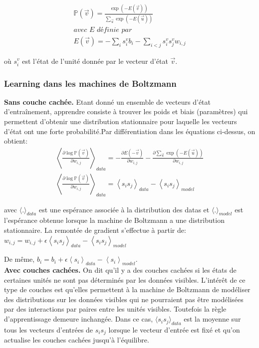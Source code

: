 \documentclass{article}
\theoremstyle{definition}
\begin{document}
\begin{align*}
\mathbb{P}(\vec{v})=\frac{\exp(-E(\vec{v}))}{\sum_{\vec{u}} \exp(-E(\vec{u}))}\\
\textit{avec E définie par}\\
E(\vec{v})=-\sum_i s_i^{v} b_i-\sum_{i < j} s_i^{v} s_j^{v} w_{i,j}
\end{align*}

\noindent où $s_i^v$ est l'état de l'unité donnée par le vecteur d'état $\vec{v}$.

\subsubsection{Learning dans les machines de Boltzmann}

\textbf{Sans couche cachée.} Etant donné un ensemble de vecteurs d'état d'entraînement, apprendre consiste à trouver les poids et biais (paramètres) qui permettent d'obtenir une distribution stationnaire pour laquelle les vecteurs d'état ont une forte probabilité.Par différentiation dans les équations ci-dessus, on obtient:
\begin{align*}
\left\langle\frac{\partial \log \mathbb{P}(\vec{v})}{\partial w_{i,j}}\right\rangle_{data}=-\frac{\partial E(-\vec{v})}{\partial w_{i,j}}-\frac{\partial\sum_{\vec{u}} \exp(-E(\vec{u}))}{\partial w_{i,j}}\\
\left\langle\frac{\partial \log \mathbb{P}(\vec{v})}{\partial w_{i,j}}\right\rangle_{data}=\left\langle s_is_j\right\rangle_{data}-\left\langle s_is_j\right\rangle_{model}
\end{align*}

\noindent avec $\langle.\rangle_{data}$ est une espérance associée à la distribution des datas et $\langle.\rangle_{model}$ est l'espérance obtenue lorsque la machine de Boltzmann a une distribution stationnaire. La remontée de gradient s'effectue à partir de:
$w_{i,j}=w_{i,j}+\epsilon \left\langle s_is_j\right\rangle_{data}-\left\langle s_is_j\right\rangle_{model}$

\noindent De même, $b_i=b_i+\epsilon \left\langle s_i\right\rangle_{data}-\left\langle s_i\right\rangle_{model}$.\\

\textbf{Avec couches cachées.} On dit qu'il y a des couches cachées si les états de certaines unités ne sont pas déterminés par les données visibles. L'intérêt de ce type de couches est qu'elles permettent à la machine de Boltzmann de modéliser des distributions sur les données visibles qui ne pourraient pas être modélisées par des interactions par paires entre les unités visibles. Toutefois la règle d'apprentissage demeure inchangée. Dans ce cas,
$\langle s_i s_j\rangle_{data}$  est la moyenne sur tous les vecteurs d'entrées de $s_i s_j$ lorsque le vecteur d'entrée est fixé et qu'on actualise les couches cachées jusqu'à l'équilibre.
\end{document}
